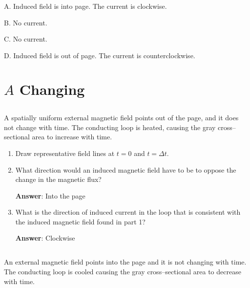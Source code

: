 \documentclass{article}
\begin{document}
A. Induced field is into page. The current is clockwise.

B. No current.

C. No current.

D. Induced field is out of page. The current is counterclockwise.
\else

\newpage
\fi

\section{$A$ Changing}

\subsection{}

A spatially uniform external magnetic field points out of the page, and it does not change with time. The conducting loop is heated, causing the gray cross--sectional area to increase with time.

\begin{enumerate}

  \item Draw representative field lines at $t=0$ and $t=\Delta t$.

        \ifsolutions

        \else

        
        \fi

  \item What direction would an induced magnetic field have to be to oppose the change in the magnetic flux?

        \ifsolutions
        {\bf Answer}: Into the page
        \else

        \fi

  \item What is the direction of induced current in the loop that is consistent with the induced magnetic field found in part 1?

        \ifsolutions
        {\bf Answer}: Clockwise
        \else

        \fi

\end{enumerate}

\subsection{}

An external magnetic field points into the page and it is not changing with time. The conducting loop is cooled causing the gray cross--sectional area to decrease with time.
\end{document}
